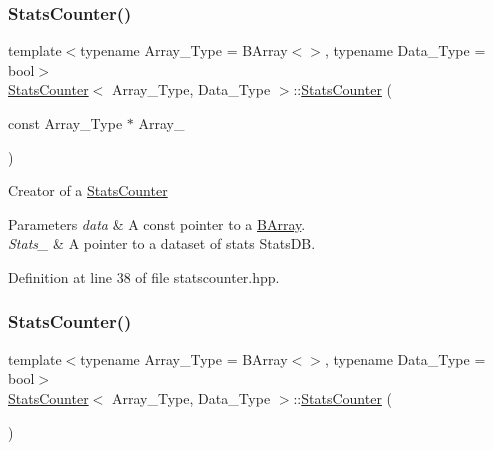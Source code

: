 \subsubsection{\texorpdfstring{Stats\+Counter()}{StatsCounter()}\hspace{0.1cm}{\footnotesize\ttfamily [1/2]}}
{\footnotesize\ttfamily template$<$typename Array\+\_\+\+Type = B\+Array$<$$>$, typename Data\+\_\+\+Type = bool$>$ \\
\hyperlink{class_stats_counter}{Stats\+Counter}$<$ Array\+\_\+\+Type, Data\+\_\+\+Type $>$\+::\hyperlink{class_stats_counter}{Stats\+Counter} (\begin{DoxyParamCaption}\item[{const Array\+\_\+\+Type $\ast$}]{Array\+\_\+ }\end{DoxyParamCaption})\hspace{0.3cm}{\ttfamily [inline]}}



Creator of a {\ttfamily \hyperlink{class_stats_counter}{Stats\+Counter}} 


\begin{DoxyParams}{Parameters}
{\em data} & A const pointer to a {\ttfamily \hyperlink{class_b_array}{B\+Array}}. \\
\hline
{\em Stats\+\_\+} & A pointer to a dataset of stats {\ttfamily Stats\+DB}. \\
\hline
\end{DoxyParams}


Definition at line 38 of file statscounter.\+hpp.

\mbox{\label{class_stats_counter_a6cef1e5bb4914a49ba8dd0f63070f81c}} 
\subsubsection{\texorpdfstring{Stats\+Counter()}{StatsCounter()}\hspace{0.1cm}{\footnotesize\ttfamily [2/2]}}
{\footnotesize\ttfamily template$<$typename Array\+\_\+\+Type = B\+Array$<$$>$, typename Data\+\_\+\+Type = bool$>$ \\
\hyperlink{class_stats_counter}{Stats\+Counter}$<$ Array\+\_\+\+Type, Data\+\_\+\+Type $>$\+::\hyperlink{class_stats_counter}{Stats\+Counter} (\begin{DoxyParamCaption}{ }\end{DoxyParamCaption})\hspace{0.3cm}{\ttfamily [inline]}}



